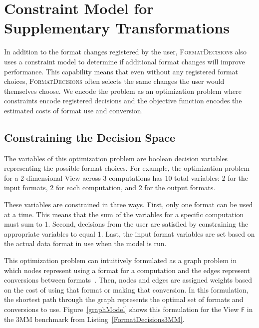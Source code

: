 \documentclass[sigconf,review=true]{acmart}
\newcommand{\FormatDecisions}[0]{{\textsc{FormatDecisions}}}
\begin{document}
\section{Constraint Model for Supplementary Transformations}

In addition to the format changes registered by the user, \FormatDecisions{} also uses a constraint model to determine if additional format changes will improve performance. 
This capability means that even without any registered format choices, \FormatDecisions{} often selects the same changes the user would themselves choose. 
We encode the problem as an optimization problem where constraints encode registered decisions and the objective function encodes the estimated costs of format use and conversion.

\subsection{Constraining the Decision Space}
The variables of this optimization problem are boolean decision variables representing the possible format choices. 
For example, the optimization problem for a 2-dimensional View across 3 computations has 10 total variables: 2 for the input formats, 2 for each computation, and 2 for the output formats.

These variables are constrained in three ways.
First, only one format can be used at a time. 
This means that the sum of the variables for a specific computation must sum to 1. 
Second, decisions from the user are satisfied by constraining the appropriate variables to equal 1. 
Last, the input format variables are set based on the actual data format in use when the model is run. 

This optimization problem can intuitively formulated as a graph problem in which nodes represent using a format for a computation and the edges represent conversions between formats~\cite{kennedy1998automatic}. 
Then, nodes and edges are assigned weights based on the cost of using that format or making that conversion. 
In this formulation, the shortest path through the graph represents the optimal set of formats and conversions to use.
Figure~\ref{graphModel} shows this formulation for the View \verb.F. in the 3MM benchmark from Listing~\ref{FormatDecisions3MM}.
\end{document}
